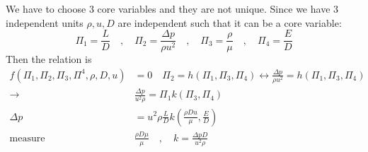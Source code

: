 \documentclass{article}
\theoremstyle{remark}
\begin{document}
We have to choose $3$ core variables and they are not unique.  Since we have $3$ independent units $\rho , u, D$ are independent such that it can be a core variable: \[
\Pi _{1} = \frac{L}{D} \quad , \quad  \Pi _{2} = \frac{\Delta p}{\rho u^2} \quad , \quad \Pi _{3} = \frac{\rho}{\mu} \quad , \quad  \Pi _{4} = \frac{E}{D}    
\] 
Then the relation is \[
  \begin{split}
    f\left( \Pi _{1}, \Pi _{2} , \Pi _3, \Pi ^{4},\rho, D, u \right) &= 0  \quad  \Pi _{2} = h\left( \Pi _{1}, \Pi _{3}, \Pi _{4} \right) \leftrightarrow \frac{\Delta p}{\rho u^2} = h\left( \Pi _{1}, \Pi _3 , \Pi _{4} \right) \\
    \to  & \frac{\Delta p}{ u^2 \rho} = \Pi _{1} k\left( \Pi _{3}, \Pi _{4} \right)\\
    \Delta p &= u^2 \rho \frac{L}{D} k \left( \frac{\rho D u}{\mu}, \frac{E}{D} \right)   \\
    \text{measure} \quad & \frac{\rho D \mu}{ \mu} \quad ,\quad    k= \frac{\Delta p D }{u^2\rho}
  \end{split}
\]
  


\end{document}
